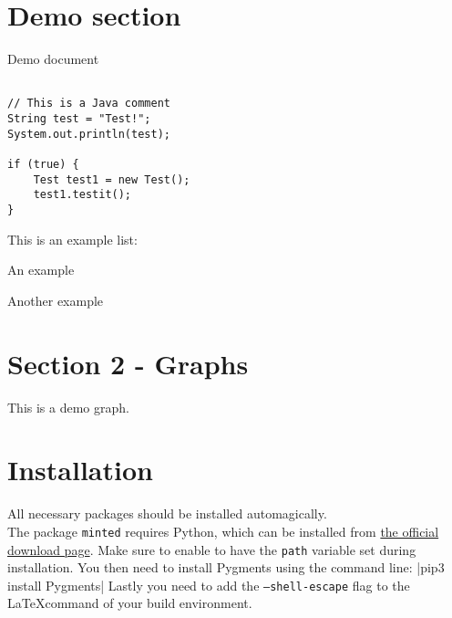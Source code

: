 \documentclass[a4paper,10pt]{article}
\begin{document}
\section*{Demo section}
Demo document

\begin{verbatim}

// This is a Java comment
String test = "Test!";
System.out.println(test);

if (true) {
	Test test1 = new Test();
	test1.testit();
}
\end{verbatim}

This is an example list:

\begin{arrowlist}
\item An example
\item Another example
\end{arrowlist}

\section*{Section 2 - Graphs}
This is a demo graph.


\section*{Installation}
All necessary packages should be installed automagically.\\
The package \texttt{minted} requires Python, which can be installed from \href{https://www.python.org/downloads/}{the official download page}. Make sure to enable to have the \texttt{path} variable set during installation. You then need to install Pygments using the command line:
|pip3 install Pygments|
Lastly you need to add the \texttt{--shell-escape} flag to the \LaTeX command of your build environment.
\end{document}
